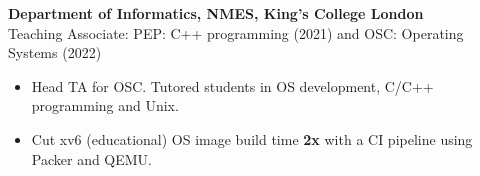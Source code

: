 \documentclass[11pt,a4paper]{article}
\newcommand{\years}[1]{\marginnote{\footnotesize\myfont #1}} %
\begin{document}
\years{2021-22} \textbf{Department of Informatics, NMES, King's College London} \\
    Teaching Associate: PEP: C++ programming (2021) and OSC: Operating Systems (2022) 
    \begin{itemize}[itemsep=-1mm,topsep=0pt,partopsep=0pt,leftmargin=5mm]
     \item Head TA for OSC. Tutored students in OS development, C/C++ programming and Unix.
     \item Cut xv6 (educational) OS image build time \textbf{2x} with a CI pipeline using Packer and QEMU.\medskip
    \end{itemize}
\end{document}
